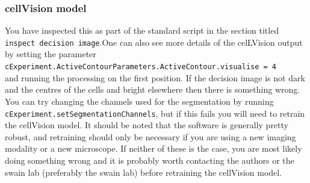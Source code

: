 \subsubsection{cellVision model} You have inspected this as part of the standard script in the section titled \texttt{inspect decision image}.One can also see more details of the celLVision output by setting the parameter\\
 \texttt{cExperiment.ActiveContourParameters.ActiveContour.visualise = 4} \\
and running the processing on the first position. If the decision image is not dark and the centres of the cells and bright elsewhere then there is something wrong. You can try changing the channels used for the segmentation by running \texttt{cExperiment.setSegmentationChannels}, but if this fails you will need to retrain the cellVision model. It should be noted that the software is generally pretty robust, and retraining should only be necessary if you are using a new imaging modality or a new microscope. If neither of these is the case, you are most likely doing something wrong and it is probably worth contacting the authors or the swain lab (preferably the swain lab) before retraining the cellVision model.
